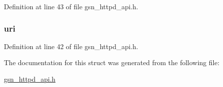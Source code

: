 Definition at line 43 of file gsn\_\-httpd\_\-api.h.

\hypertarget{a00446_a0153cffe7ce2a9b72ddc1a48fd8e4add}{
\subsubsection[{uri}]{ {\bf uri}}}
\label{a00446_a0153cffe7ce2a9b72ddc1a48fd8e4add}


Definition at line 42 of file gsn\_\-httpd\_\-api.h.



The documentation for this struct was generated from the following file:\begin{DoxyCompactItemize}
\item 
\hyperlink{a00509}{gsn\_\-httpd\_\-api.h}\end{DoxyCompactItemize}
